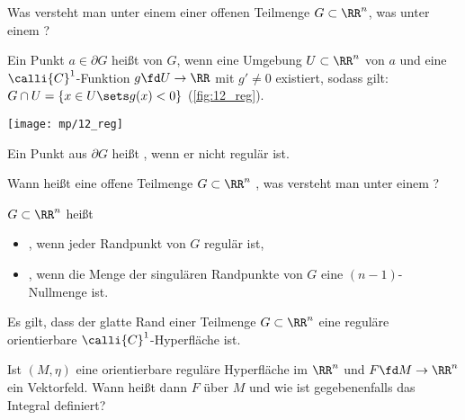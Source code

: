 \begin{frage}
  Was versteht man unter einem  einer 
  offenen Teilmenge $G\subset\RR^n$, was unter einem ? 
\end{frage}

\begin{antwort}
  Ein Punkt $a\in\partial G$ heißt  von $G$, 
  wenn eine Umgebung $U\subset \RR^n$ von $a$ und eine $\calli{C}^1$-Funktion 
  $g\fd U\to\RR$ mit $g'\not=0$ existiert, sodass gilt: 
  $G\cap U = \{ x\in U\sets g(x) < 0 \}$ (\sieheAbbildung\ref{fig:12_reg}).

  \begin{center}
    \texttt{[image: mp/12\_reg]}
    \label{fig:12_reg}
  \end{center}

  Ein Punkt aus $\partial G$ heißt , wenn 
  er nicht regulär ist. 
  \AntEnd
\end{antwort} 

\begin{frage}
  Wann heißt eine offene Teilmenge $G\subset\RR^n$ , 
  was versteht man unter einem ?
\end{frage}

\begin{antwort}
  $G\subset\RR^n$ heißt 
  \begin{itemize}
  \item {}, wenn jeder Randpunkt von $G$ 
    regulär ist, 
  \item {}, wenn die Menge der singulären 
    Randpunkte von $G$ eine $(n-1)$-Nullmenge ist. 
  \end{itemize}
  Es gilt, dass der glatte Rand einer Teilmenge $G\subset\RR^n$ eine 
  reguläre orientierbare $\calli{C}^1$-Hyperfläche ist. 
  \AntEnd  
\end{antwort} 

\begin{frage}\label{12_flint}
  Ist $(M,\eta)$ eine orientierbare reguläre Hyperfläche im $\RR^n$ und 
  $F\fd M \to \RR^n$ ein Vektorfeld. Wann heißt dann 
  $F$ über $M$  und wie ist gegebenenfalls 
  das Integral definiert?
\end{frage}

